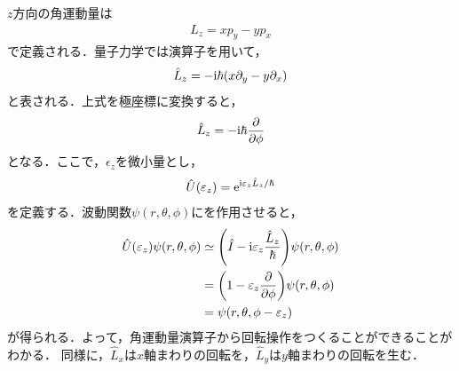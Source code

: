 \documentclass{report}
\begin{document}
  $z$方向の角運動量は
  \begin{align}
    L_z = xp_y - y p_x
  \end{align}
  で定義される．量子力学では演算子を用いて，
  \begin{align}
    \hat{L}_z = -\mathrm{i}\hbar(x\partial_y - y\partial_x)
  \end{align}
  と表される．上式を極座標に変換すると，
  \begin{align}
    \hat{L}_z = -\mathrm{i}\hbar\frac{\partial}{\partial \phi}
  \end{align}
  となる．ここで，$\epsilon_z$を微小量とし，
  \begin{align}
    \hat{U}(\varepsilon_z) = \mathrm{e}^{\mathrm{i} \varepsilon_z\hat{L}_z/\hbar} \label{rotation-operator-of-z}
  \end{align}
  を定義する．波動関数$\psi(r,\theta,\phi)$にを作用させると，
  \begin{align}
    \hat{U}(\varepsilon_z)\psi(r,\theta,\phi) &\simeq \qty(\hat{I} - \mathrm{i}\varepsilon_z\frac{\hat{L}_z}{\hbar})\psi(r,\theta,\phi)\\
    &= \qty(1 - \varepsilon_z \frac{\partial}{\partial \phi})\psi(r,\theta,\phi)\\
    &= \psi(r,\theta,\phi - \varepsilon_z)
  \end{align}
  が得られる．よって，角運動量演算子から回転操作をつくることができることがわかる．
  同様に，$\hat{L}_x$は$x$軸まわりの回転を，$\hat{L}_y$は$y$軸まわりの回転を生む．
\end{document}
